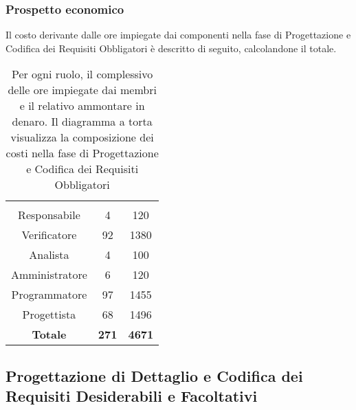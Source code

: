 \subsubsection{Prospetto economico}
Il costo derivante dalle ore impiegate dai componenti nella fase di Progettazione e Codifica dei Requisiti Obbligatori è descritto di seguito, calcolandone il totale.

\begin{table}[H]
	{\setlength{\parindent}{0cm}
		\begin{minipage}{.43\textwidth}
			\begin{tabular}{ccc}
				\rowcolorhead
				\headertitle{Ruolo} & \headertitle{Ore} & \headertitle{Costo(\euro{})}\\
				Responsabile & 4 & 120\\
				Verificatore & 92 & 1380\\
				Analista & 4 & 100\\
				Amministratore & 6 & 120\\
				Programmatore & 97 & 1455\\
				Progettista & 68 & 1496\\
				\hline
				\textbf{Totale} & \textbf{271} & \textbf{4671}\\
			\end{tabular}
		\end{minipage}%
		\begin{minipage}{.57\textwidth}
	\end{minipage} }
	\caption[Prospetto economico della fase di Progettazione e Codifica dei Requisiti Obbligatori]{Per ogni ruolo, il complessivo delle ore impiegate dai membri e il relativo ammontare in denaro. Il diagramma a torta visualizza la composizione dei costi nella fase di Progettazione e Codifica dei Requisiti Obbligatori}
\end{table} 




\subsection{Progettazione di Dettaglio e Codifica dei Requisiti Desiderabili e Facoltativi}




